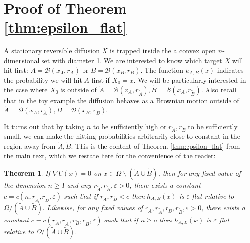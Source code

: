 \documentclass[12pt, nofootinbib,english, amsmath, amssymb, aps, priprint, graphicx,floatfix]{revtex4-1}
\newtheorem{theorem}{Theorem}
\theoremstyle{plain}
\theoremstyle{definition}
\theoremstyle{plain}
\newcommand{\bb}[1]{\mathcal{B}\left(#1\right)}
\newcommand{\dA}{{\dot A}}
\newcommand{\tA}{{\tilde A}}
\newcommand{\dB}{{\dot B}}
\newcommand{\tB}{{\tilde B}}
\begin{document}
\section{Proof of Theorem \ref{thm:epsilon_flat}}
\label{sec:proof_epsilon_flat}

A stationary reversible diffusion $X$ is trapped inside the a convex open $n$-dimensional set with diameter 1.  We are interested to know which target $X$ will hit first: $A=\bb{x_A,r_A}$ or $B=\bb{x_B,r_B}$.  The function $h_{A,B}(x)$ indicates the probability we will hit $A$ first if $X_0=x$.  We will be particularly interested in the case where $X_0$ is outside of $\tilde A=\bb{x_A,r_{\tilde A}},\tilde B=\bb{x_A,r_{\tilde B}}$.  Also recall that in the toy example the diffusion behaves as a Brownian motion outside of $\dot A=\bb{x_A,r_{\dot A}},\dot B=\bb{x_B,r_{\dot B}}$.  

It turns out that by taking $n$ to be sufficiently high or $r_{\dot A},r_{\dot B}$ to be sufficiently small, we can make the hitting probabilities arbitrarily close to constant in the region away from $\tilde A,\tilde B$.  This is the content of Theorem \ref{thm:epsilon_flat} from the main text, which we restate here for the convenience of the reader:

\begingroup
\def\thetheorem{\ref{thm:epsilon_flat}}
\begin{theorem}  
If $\nabla U(x)=0$ on $x\in\Omega\backslash(\tA\cup\tB)$, then
for any fixed value of the dimension $n \geq 3$ and any $r_{\tilde{A}}, r_{\tilde{B}}, \varepsilon > 0$, there exists a constant $c=c(n, r_{\tilde{A}}, r_{\tilde{B}}, \varepsilon)$ such that if $r_{\dA}, r_{\dB} < c$ then 
$h_{A,B}(x)$ is 
$\varepsilon$-flat  relative to 
$\Omega / (\tilde{A} \cup \tilde{B})$.  
Likewise, for any fixed values of $r_{\dA}, r_{\tilde{A}}, r_{\dB}, r_{\tilde{B}}, \varepsilon>0$, there exists a constant $c=c(r_\dA, r_{\tilde{A}}, r_\dB, r_{\tilde{B}}, \varepsilon)$ such that if $n \geq c$ then 
$h_{A,B}(x)$ is
$\varepsilon$-flat relative to 
$\Omega / (\tilde{A} \cup \tilde{B})$. 
\end{theorem}
\addtocounter{theorem}{-1}
\endgroup
\end{document}
